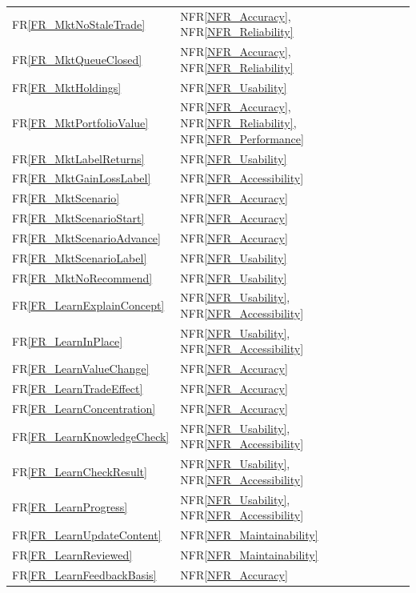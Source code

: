 \documentclass[12pt]{article}
\newcommand{\rref}[1]{FR\ref{#1}}
\newcommand{\nfrref}[1]{NFR\ref{#1}}
\begin{document}
\begin{longtable}{p{} p{}}
\rref{FR_MktNoStaleTrade} & \nfrref{NFR_Accuracy}, \nfrref{NFR_Reliability} \\
\rref{FR_MktQueueClosed} & \nfrref{NFR_Accuracy}, \nfrref{NFR_Reliability} \\
\rref{FR_MktHoldings} & \nfrref{NFR_Usability} \\
\rref{FR_MktPortfolioValue} & \nfrref{NFR_Accuracy}, \nfrref{NFR_Reliability}, \nfrref{NFR_Performance} \\
\rref{FR_MktLabelReturns} & \nfrref{NFR_Usability} \\
\rref{FR_MktGainLossLabel} & \nfrref{NFR_Accessibility} \\
\rref{FR_MktScenario} & \nfrref{NFR_Accuracy} \\
\rref{FR_MktScenarioStart} & \nfrref{NFR_Accuracy} \\
\rref{FR_MktScenarioAdvance} & \nfrref{NFR_Accuracy} \\
\rref{FR_MktScenarioLabel} & \nfrref{NFR_Usability} \\
\rref{FR_MktNoRecommend} & \nfrref{NFR_Usability} \\


\rref{FR_LearnExplainConcept} & \nfrref{NFR_Usability}, \nfrref{NFR_Accessibility} \\
\rref{FR_LearnInPlace} & \nfrref{NFR_Usability}, \nfrref{NFR_Accessibility} \\
\rref{FR_LearnValueChange} & \nfrref{NFR_Accuracy} \\
\rref{FR_LearnTradeEffect} & \nfrref{NFR_Accuracy} \\
\rref{FR_LearnConcentration} & \nfrref{NFR_Accuracy} \\
\rref{FR_LearnKnowledgeCheck} & \nfrref{NFR_Usability}, \nfrref{NFR_Accessibility} \\
\rref{FR_LearnCheckResult} & \nfrref{NFR_Usability}, \nfrref{NFR_Accessibility} \\
\rref{FR_LearnProgress} & \nfrref{NFR_Usability}, \nfrref{NFR_Accessibility} \\
\rref{FR_LearnUpdateContent} & \nfrref{NFR_Maintainability} \\
\rref{FR_LearnReviewed} & \nfrref{NFR_Maintainability} \\
\rref{FR_LearnFeedbackBasis} & \nfrref{NFR_Accuracy} \\



\end{longtable}
\end{document}
